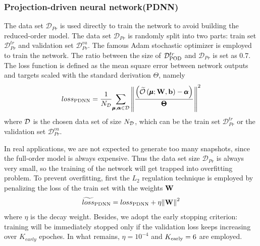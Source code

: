 \documentclass[preprint, 10pt]{elsarticle}
\begin{document}
\subsubsection{Projection-driven neural network(PDNN)}
The data set $\mathcal{D}_{Pr}$ is used directly to train the network to avoid building the reduced-order model. The data set $\mathcal{D}_{Pr}$ is randomly split into two parts: train set $\mathcal{D}_{Pr}^{tr}$ and validation set $\mathcal{D}_{Pr}^{va}$. The famous Adam  stochastic  optimizer \cite{kingma2014adam} is employed to train the network. The ratio between the size of $\mathcal{D}_{\rm{POD}}^{tr}$ and $\mathcal{D}_{Pr}$  is set as 0.7. The loss function is defined as the mean square error between network outputs and targets scaled with the standard derivation $\Theta$, namely
\begin{equation}
loss_{\rm{PDNN}} = \frac{1}{N_{\cal D}}
{{\sum\limits_{\pmb\mu ,\pmb\alpha  \in {\cal D}} {{{\left\| {\frac{\left( {\widetilde {\cal O}\left( {\pmb\mu ;{\bf{W}},{\bf{b}}} \right) - \pmb{\alpha} } \right)} {\pmb{\Theta}} } \right\|}^2}} }}
\end{equation}
where $\cal D$ is the chosen data set of size $N_{\cal D}$, which can be the train set $\mathcal{D}_{Pr}^{tr}$ or the validation set $\mathcal{D}_{Pr}^{va}$.

In real applications, we are not expected to generate too many snapshots, since the full-order model is always expensive. Thus the data set size $\mathcal{D}_{Pr}$ is always very small, so the training of the network will get trapped into overfitting problem. To prevent overfitting, first the $L_2$ regulation technique is employed by penalizing the loss of the train set with the weights $\bf{W}$
\begin{equation}
\widetilde{loss}_{\rm{PDNN}}
 = loss_{\rm{PDNN}}
  + \eta {\left\| { \mathbf{W} } \right\|}^2
\end{equation}
where $\eta$ is the decay weight.
Besides, we adopt the early stopping criterion: training will be immediately stopped only if the validation loss keeps increasing over $K_{early}$ epoches. In what remains, $\eta=10^{-4}$ and $K_{\rm{early}}=6$ are employed.
\end{document}

